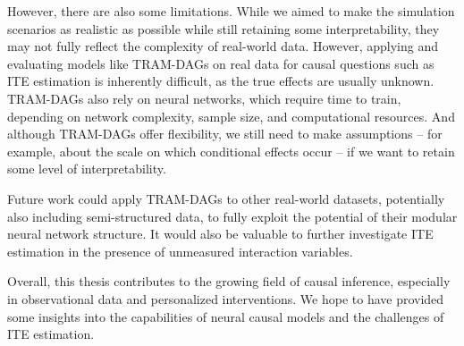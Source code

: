 \medskip

However, there are also some limitations. While we aimed to make the simulation scenarios as realistic as possible while still retaining some interpretability, they may not fully reflect the complexity of real-world data. However, applying and evaluating models like TRAM-DAGs on real data for causal questions such as ITE estimation is inherently difficult, as the true effects are usually unknown. TRAM-DAGs also rely on neural networks, which require time to train, depending on network complexity, sample size, and computational resources. And although TRAM-DAGs offer flexibility, we still need to make assumptions -- for example, about the scale on which conditional effects occur -- if we want to retain some level of interpretability.

\medskip

Future work could apply TRAM-DAGs to other real-world datasets, potentially also including semi-structured data, to fully exploit the potential of their modular neural network structure. It would also be valuable to further investigate ITE estimation in the presence of unmeasured interaction variables.

\medskip
Overall, this thesis contributes to the growing field of causal inference, especially in observational data and personalized interventions. We hope to have provided some insights into the capabilities of neural causal models and the challenges of ITE estimation.

